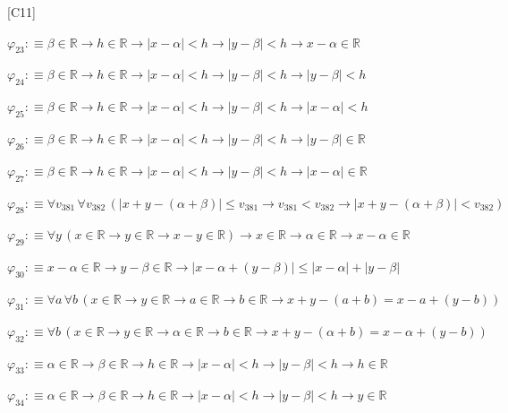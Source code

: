 \begin{fullproof}{[C11]}
\begin{abbrevlist}
\item $\varphi_{23} :\equiv \beta \in \mathbb{R} \to h \in \mathbb{R} \to \lvert x - \alpha \rvert < h \to \lvert y - \beta \rvert < h \to x - \alpha \in \mathbb{R}$
\item $\varphi_{24} :\equiv \beta \in \mathbb{R} \to h \in \mathbb{R} \to \lvert x - \alpha \rvert < h \to \lvert y - \beta \rvert < h \to \lvert y - \beta \rvert < h$
\item $\varphi_{25} :\equiv \beta \in \mathbb{R} \to h \in \mathbb{R} \to \lvert x - \alpha \rvert < h \to \lvert y - \beta \rvert < h \to \lvert x - \alpha \rvert < h$
\item $\varphi_{26} :\equiv \beta \in \mathbb{R} \to h \in \mathbb{R} \to \lvert x - \alpha \rvert < h \to \lvert y - \beta \rvert < h \to \lvert y - \beta \rvert \in \mathbb{R}$
\item $\varphi_{27} :\equiv \beta \in \mathbb{R} \to h \in \mathbb{R} \to \lvert x - \alpha \rvert < h \to \lvert y - \beta \rvert < h \to \lvert x - \alpha \rvert \in \mathbb{R}$
\item $\varphi_{28} :\equiv \forall v_{381}\,\forall v_{382}\,(\lvert x + y - (\alpha + \beta) \rvert \leq v_{381} \to v_{381} < v_{382} \to \lvert x + y - (\alpha + \beta) \rvert < v_{382})$
\item $\varphi_{29} :\equiv \forall y\,(x \in \mathbb{R} \to y \in \mathbb{R} \to x - y \in \mathbb{R}) \to x \in \mathbb{R} \to \alpha \in \mathbb{R} \to x - \alpha \in \mathbb{R}$
\item $\varphi_{30} :\equiv x - \alpha \in \mathbb{R} \to y - \beta \in \mathbb{R} \to \lvert x - \alpha + (y - \beta) \rvert \leq \lvert x - \alpha \rvert + \lvert y - \beta \rvert$
\item $\varphi_{31} :\equiv \forall a\,\forall b\,(x \in \mathbb{R} \to y \in \mathbb{R} \to a \in \mathbb{R} \to b \in \mathbb{R} \to x + y - (a + b) = x - a + (y - b))$
\item $\varphi_{32} :\equiv \forall b\,(x \in \mathbb{R} \to y \in \mathbb{R} \to \alpha \in \mathbb{R} \to b \in \mathbb{R} \to x + y - (\alpha + b) = x - \alpha + (y - b))$
\item $\varphi_{33} :\equiv \alpha \in \mathbb{R} \to \beta \in \mathbb{R} \to h \in \mathbb{R} \to \lvert x - \alpha \rvert < h \to \lvert y - \beta \rvert < h \to h \in \mathbb{R}$
\item $\varphi_{34} :\equiv \alpha \in \mathbb{R} \to \beta \in \mathbb{R} \to h \in \mathbb{R} \to \lvert x - \alpha \rvert < h \to \lvert y - \beta \rvert < h \to y \in \mathbb{R}$

\end{abbrevlist}
\end{fullproof}

